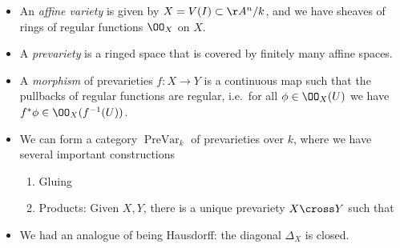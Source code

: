 \begin{itemize}
\item
  An \emph{affine variety} is given by \(X = V(I) \subset \AA^n/k\), and
  we have sheaves of rings of regular functions \(\OO_X\) on \(X\).
\item
  A \emph{prevariety} is a ringed space that is covered by finitely many
  affine spaces.
\item
  A \emph{morphism} of prevarieties \(f:X\to Y\) is a continuous map
  such that the pullbacks of regular functions are regular, i.e.~for all
  \(\phi \in \OO_X(U)\) we have \(f^* \phi \in \OO_X(f^{-1} (U) )\).
\item
  We can form a category \(\operatorname{PreVar}_k\) of prevarieties
  over \(k\), where we have several important constructions

  \begin{enumerate}
  \def\labelenumi{\arabic{enumi}.}
  \item
    Gluing
  \item
    Products: Given \(X, Y\), there is a unique prevariety \(X\cross Y\)
    such that

    \begin{center}
    \end{center}
  \end{enumerate}
\item
  We had an analogue of being Hausdorff: the diagonal \(\Delta_X\) is
  closed.
\end{itemize}

